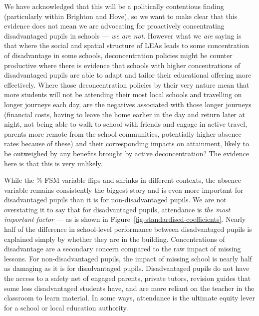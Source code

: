 \documentclass[
  11pt,
]{article}
\begin{document}
We have acknowledged that this will be a politically contentious finding
(particularly within Brighton and Hove), so we want to make clear that
this evidence does not mean we are advocating for proactively
concentrating disadvantaged pupils in schools --- \emph{we are not}.
However what we \emph{are} saying is that where the social and spatial
structure of LEAs leads to some concentration of disadvantage in some
schools, deconcentration policies might be counter productive where
there is evidence that schools with higher concentrations of
disadvantaged pupils are able to adapt and tailor their educational
offering more effectively. Where those deconcentration policies by their
very nature mean that more students will not be attending their most
local schools and travelling on longer journeys each day, are the
negatives associated with those longer journeys (financial costs, having
to leave the home earlier in the day and return later at night, not
being able to walk to school with friends and engage in active travel,
parents more remote from the school communities, potentially higher
absence rates because of these) and their corresponding impacts on
attainment, likely to be outweighed by any benefits brought by active
deconcentration? The evidence here is that this is very unlikely.

While the \% FSM variable flips and shrinks in different contexts, the
absence variable remains consistently the biggest story and is even more
important for disadvantaged pupils than it is for non-disadvantaged
pupils. We are not overstating it to say that for disadvantaged pupils,
attendance is \emph{the most important factor} --- as is shown in
Figure~\ref{fig-standardised-coefficients}. Nearly half of the
difference in school-level performance between disadvantaged pupils is
explained simply by whether they are in the building. Concentrations of
disadvantage are a secondary concern compared to the raw impact of
missing lessons. For non-disadvantaged pupils, the impact of missing
school is nearly half as damaging as it is for disadvantaged pupils.
Disadvantaged pupils do not have the access to a safety net of engaged
parents, private tutors, revision guides that some less disadvantaged
students have, and are more reliant on the teacher in the classroom to
learn material. In some ways, attendance is the ultimate equity lever
for a school or local education authority.
\end{document}
